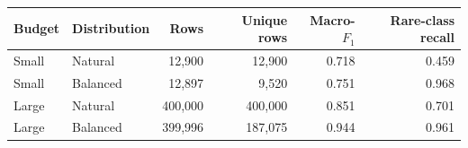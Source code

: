 \begin{tabular}{@{}llrrrr@{}}
\toprule
Budget & Distribution & Rows & Unique rows & Macro-$F_1$ & Rare-class recall \\
\midrule
Small & Natural & 12,900 & 12,900 & 0.718 & 0.459 \\
Small & Balanced & 12,897 & 9,520 & 0.751 & 0.968 \\
Large & Natural & 400,000 & 400,000 & 0.851 & 0.701 \\
Large & Balanced & 399,996 & 187,075 & 0.944 & 0.961 \\
\bottomrule
\end{tabular}